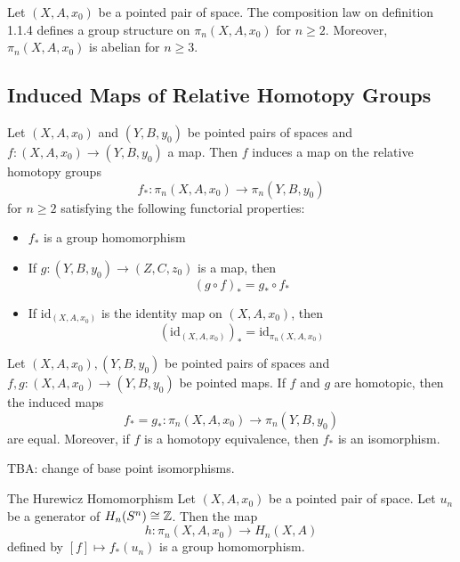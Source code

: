 \documentclass[a4paper]{article}
\begin{document}
\begin{thm}{}{} Let $(X,A,x_0)$ be a pointed pair of space. The composition law on definition 1.1.4 defines a group structure on $\pi_n(X,A,x_0)$ for $n\geq 2$. Moreover, $\pi_n(X,A,x_0)$ is abelian for $n\geq 3$. 
\end{thm}

\subsection{Induced Maps of Relative Homotopy Groups}
\begin{thm}{}{} Let $(X,A,x_0)$ and $(Y,B,y_0)$ be pointed pairs of spaces and $f:(X,A,x_0)\to(Y,B,y_0)$ a map. Then $f$ induces a map on the relative homotopy groups $$f_\ast:\pi_n(X,A,x_0)\to\pi_n(Y,B,y_0)$$ for $n\geq 2$ satisfying the following functorial properties: 
\begin{itemize}
\item $f_\ast$ is a group homomorphism
\item If $g:(Y,B,y_0)\to(Z,C,z_0)$ is a map, then $$(g\circ f)_\ast=g_\ast\circ f_\ast$$
\item If $\text{id}_{(X,A,x_0)}$ is the identity map on $(X,A,x_0)$, then $$(\text{id}_{(X,A,x_0)})_\ast=\text{id}_{\pi_n(X,A,x_0)}$$
\end{itemize}
\end{thm}

\begin{thm}{}{} Let $(X,A,x_0),(Y,B,y_0)$ be pointed pairs of spaces and $f,g:(X,A,x_0)\to (Y,B,y_0)$ be pointed maps. If $f$ and $g$ are homotopic, then the induced maps $$f_\ast=g_\ast:\pi_n(X,A,x_0)\to\pi_n(Y,B,y_0)$$ are equal. Moreover, if $f$ is a homotopy equivalence, then $f_\ast$ is an isomorphism. 
\end{thm}

TBA: change of base point isomorphisms. 

\begin{thm}{The Hurewicz Homomorphism}{} Let $(X,A,x_0)$ be a pointed pair of space. Let $u_n$ be a generator of $H_n(S^n)\cong\mathbb{Z}$. Then the map $$h:\pi_n(X,A,x_0)\to H_n(X,A)$$ defined by $[f]\mapsto f_\ast(u_n)$ is a group homomorphism. 
\end{thm}
\end{document}
